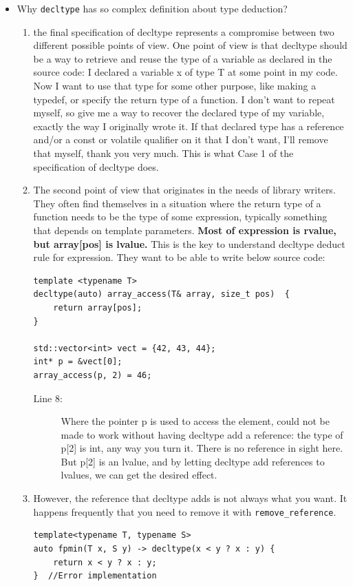 \documentclass[a4paper,11pt,twoside]{book}
\begin{document}
\begin{itemize}
\item Why \texttt{decltype} has so complex definition about type deduction?
\begin{enumerate}
	\item the final specification of decltype represents a compromise between two different possible points of view. One point of view is that decltype should be a way to retrieve and reuse the type of a variable as declared in the source code: I declared a variable x of type T at some point in my code. Now I want to use that type for some other purpose, like making a typedef, or specify the return type of a function. I don't want to repeat myself, so give me a way to recover the declared type of my variable, exactly the way I originally wrote it. If that declared type has a reference and/or a const or volatile qualifier on it that I don't want, I'll remove that myself, thank you very much. This is what Case 1 of the specification of decltype does.
	
	\item  The second point of view that originates in the needs of library writers. They often find themselves in a situation where the return type of a function needs to be the type of some expression, typically something that depends on template parameters. \textbf{Most of expression is rvalue, but array[pos] is lvalue.} This is the key to understand decltype deduct rule for expression. They want to be able to write below source code:
\begin{lstlisting}
template <typename T>
decltype(auto) array_access(T& array, size_t pos)  {
	return array[pos];
}

std::vector<int> vect = {42, 43, 44};
int* p = &vect[0];
array_access(p, 2) = 46;
\end{lstlisting}
\begin{description}
	\item[Line 8:] Where the pointer p is used to access the element, could not be made to work without having decltype add a reference: the type of p[2] is int, any way you turn it. There is no reference in sight here. But p[2] is an lvalue, and by letting decltype add references to lvalues, we can get the desired effect. 
	
\end{description}

\item However, the reference that decltype adds is not always what you want. It happens frequently that you need to remove it with \texttt{remove\_reference}. 
\begin{lstlisting}
template<typename T, typename S>
auto fpmin(T x, S y) -> decltype(x < y ? x : y) {
	return x < y ? x : y;
}  //Error implementation 


\end{lstlisting}
\end{enumerate}
\end{itemize}
\end{document}
